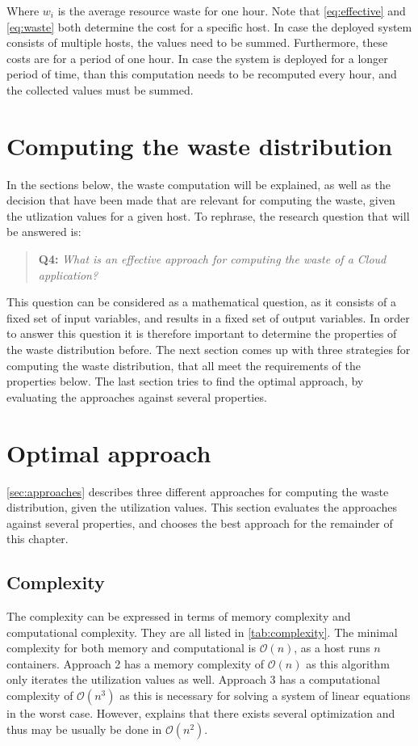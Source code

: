 \noindent
Where $w_i$ is the average resource waste for one hour. Note that \autoref{eq:effective} and \autoref{eq:waste} both determine the cost for a specific host. In case the deployed system consists of multiple hosts, the values need to be summed. Furthermore, these costs are for a period of one hour. In case the system is deployed for a longer period of time, than this computation needs to be recomputed every hour, and the collected values must be summed. 


\section{Computing the waste distribution} \label{sec:waste_into}
In the sections below, the waste computation will be explained, as well as the decision that have been made that are relevant for computing the waste, given the utlization values for a given host. To rephrase, the research question that will be answered is:

\begin{quote}
    \textbf{Q4: }\textit{What is an effective approach for computing the waste of a Cloud application?}\\
\end{quote}

\noindent
This question can be considered as a mathematical question, as it consists of a fixed set of input variables, and results in a fixed set of output variables. In order to answer this question it is therefore important to determine the properties of the waste distribution before. The next section comes up with three strategies for computing the waste distribution, that all meet the requirements of the properties below. The last section tries to find the optimal approach, by evaluating the approaches against several properties.



\section{Optimal approach} \label{sec:optimal_approach}
\autoref{sec:approaches} describes three different approaches for computing the waste distribution, given the utilization values. This section evaluates the approaches against several properties, and chooses the best approach for the remainder of this chapter.

\subsection{Complexity}
The complexity can be expressed in terms of memory complexity and computational complexity. They are all listed in \autoref{tab:complexity}. The minimal complexity for both memory and computational is $\mathcal{O}(n)$, as a host runs $n$ containers. Approach 2 has a memory complexity of $\mathcal{O}(n)$ as this algorithm only iterates the utilization values as well. Approach 3 has a computational complexity of $\mathcal{O}(n^3)$ as this is necessary for solving a system of linear equations in the worst case. However, \cite{pan1991complexity} explains that there exists several optimization and thus may be usually be done in $\mathcal{O}(n^2)$.\\

